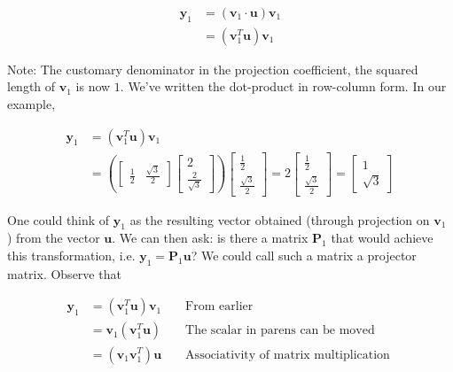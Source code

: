 \documentclass[main.tex]{subfiles}
\begin{document}
$$
\begin{aligned}
\mathbf{y}_{1} &=\left(\mathbf{v}_{1} \cdot \mathbf{u}\right) \mathbf{v}_{1} \\
&=\left(\mathbf{v}_{1}^{T} \mathbf{u}\right) \mathbf{v}_{1}
\end{aligned}
$$

Note: The customary denominator in the projection coefficient, the squared length of $\mathbf{v}_{1}$ is now $1$. We've written the dot-product in row-column form. In our example,

$$
\begin{aligned}
\mathbf{y}_{1} &=\left(\mathbf{v}_{1}^{T} \mathbf{u}\right) \mathbf{v}_{1} \\
&=\left(\left[\begin{array}{ll}
\frac{1}{2} & \frac{\sqrt{3}}{2}
\end{array}\right]\left[\begin{array}{c}
2 \\
\frac{2}{\sqrt{3}}
\end{array}\right]\right)\left[\begin{array}{c}
\frac{1}{2} \\
\frac{\sqrt{3}}{2}
\end{array}\right]=2\left[\begin{array}{r}
\frac{1}{2} \\
\frac{\sqrt{3}}{2}
\end{array}\right]=\left[\begin{array}{r}
1 \\
\sqrt{3}
\end{array}\right]
\end{aligned}
$$

One could think of $\mathbf{y}_{1}$ as the resulting vector obtained (through projection on $\mathbf{v}_{1}$ ) from the vector $\mathbf{u}$. We can then ask: is there a matrix $\mathbf{P}_{1}$ that would achieve this transformation, i.e. $\mathbf{y}_{1}=\mathbf{P}_{1} \mathbf{u}$? We could call such a matrix a projector matrix. Observe that

$$
\begin{aligned}
\mathbf{y}_{1} &=\left(\mathbf{v}_{1}^{T} \mathbf{u}\right) \mathbf{v}_{1} & & \text { From earlier } \\
&=\mathbf{v}_{1}\left(\mathbf{v}_{1}^{T} \mathbf{u}\right) & & \text { The scalar in parens can be moved } \\
&=\left(\mathbf{v}_{1} \mathbf{v}_{1}^{T}\right) \mathbf{u} & & \text { Associativity of matrix multiplication }
\end{aligned}
$$
\end{document}
